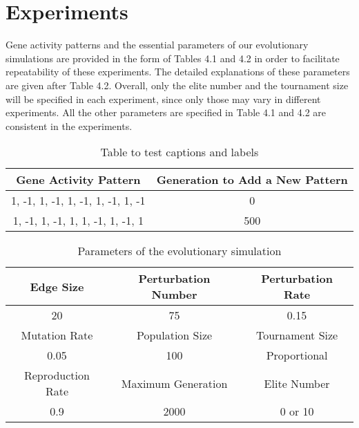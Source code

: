 \section{Experiments}
Gene activity patterns and the essential parameters of our evolutionary simulations are provided in the form of Tables 4.1 and 4.2 in order to facilitate repeatability of these experiments. The detailed explanations of these parameters are given after Table 4.2. Overall, only the elite number and the tournament size will be specified in each experiment, since only those may vary in different experiments. All the other parameters are specified in Table 4.1 and 4.2 are consistent in the experiments. 
\vspace*{-12 pt}
\begin{table}[h]
	\centering
	\caption{Table to test captions and labels}
	\label{table:4.1}
	\begin{tabular}{|c | c|} 
		\hline
		Gene Activity Pattern & Generation to Add a New Pattern \\ [0.5ex] 
		\hline
		1, -1, 1, -1, 1, -1, 1, -1, 1, -1 & 0 \\ 
		\hline
		1, -1, 1, -1, 1, 1, -1, 1, -1, 1 & 500 \\
		\hline
	\end{tabular}
\end{table}

\vspace*{-19.5 pt}
\begin{table}[h]
	\centering
	\caption{Parameters of the evolutionary simulation}
	\label{table:4.2}
	\begin{tabular}{|c | c | c |} 
		\hline
		Edge Size & Perturbation Number & Perturbation Rate \\
		\hline
		20 & 75 & 0.15 \\
		\hline
		Mutation Rate & Population Size & Tournament Size \\
		\hline
		0.05 & 100 & Proportional \\
		\hline
		Reproduction Rate & Maximum Generation & Elite Number \\
		\hline
		0.9 & 2000 & 0 or 10 \\
		\hline
	\end{tabular}
\end{table}

